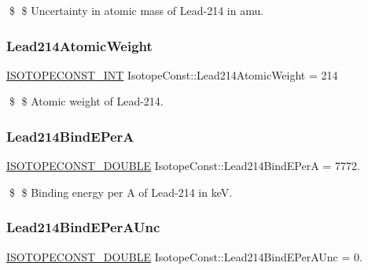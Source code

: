 \$ \$ Uncertainty in atomic mass of Lead-\/214 in amu. \mbox{\label{group___isotope_const-_lead-_pb214_gaa92d22afb25883c63dd4997ed84e3db8}} 
\subsubsection{\texorpdfstring{Lead214\+Atomic\+Weight}{Lead214AtomicWeight}}
{\footnotesize\ttfamily \mbox{\hyperlink{group___isotope_const-_macros_ga5f18360b3e99483a35c32d789e62621c}{I\+S\+O\+T\+O\+P\+E\+C\+O\+N\+S\+T\+\_\+\+I\+NT}} Isotope\+Const\+::\+Lead214\+Atomic\+Weight = 214}

\$ \$ Atomic weight of Lead-\/214. \mbox{\label{group___isotope_const-_lead-_pb214_gab64988a14c4aa481ad56743ce93c5953}} 
\subsubsection{\texorpdfstring{Lead214\+Bind\+E\+PerA}{Lead214BindEPerA}}
{\footnotesize\ttfamily \mbox{\hyperlink{group___isotope_const-_macros_ga8f45a7272ce02c0b4c65c44636ed719a}{I\+S\+O\+T\+O\+P\+E\+C\+O\+N\+S\+T\+\_\+\+D\+O\+U\+B\+LE}} Isotope\+Const\+::\+Lead214\+Bind\+E\+PerA = 7772.}

\$ \$ Binding energy per A of Lead-\/214 in keV. \mbox{\label{group___isotope_const-_lead-_pb214_gae1fd445801c433b3ab7d345d670e74e2}} 
\subsubsection{\texorpdfstring{Lead214\+Bind\+E\+Per\+A\+Unc}{Lead214BindEPerAUnc}}
{\footnotesize\ttfamily \mbox{\hyperlink{group___isotope_const-_macros_ga8f45a7272ce02c0b4c65c44636ed719a}{I\+S\+O\+T\+O\+P\+E\+C\+O\+N\+S\+T\+\_\+\+D\+O\+U\+B\+LE}} Isotope\+Const\+::\+Lead214\+Bind\+E\+Per\+A\+Unc = 0.}

